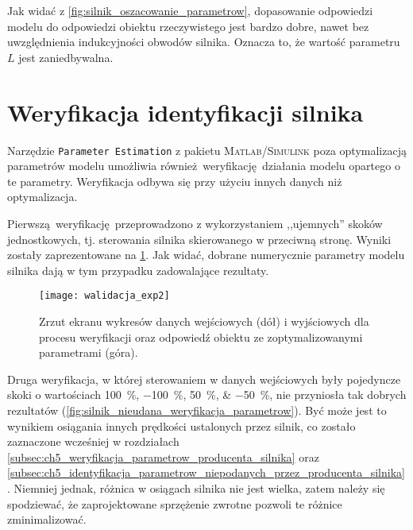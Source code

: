 
Jak widać z \cref{fig:silnik_oszacowanie_parametrow}, dopasowanie odpowiedzi modelu do odpowiedzi obiektu rzeczywistego jest bardzo dobre, nawet bez uwzględnienia indukcyjności obwodów silnika. Oznacza to, że wartość parametru $L$ jest zaniedbywalna.

\section{Weryfikacja identyfikacji silnika}
\label{sec:ch5_weryfikacja_identyfikacji_silnika}

Narzędzie \texttt{Parameter Estimation} z pakietu \textsc{Matlab/Simulink} poza optymalizacją parametrów modelu umożliwia również weryfikację działania modelu opartego o te parametry. Weryfikacja odbywa się przy użyciu innych danych niż optymalizacja.

Pierwszą weryfikację przeprowadzono z wykorzystaniem ,,ujemnych'' skoków jednostkowych, tj. sterowania silnika skierowanego w przeciwną stronę. Wyniki zostały zaprezentowane na \cref{fig:silnik_weryfikacja_parametrow}. Jak widać, dobrane numerycznie parametry modelu silnika dają w tym przypadku zadowalające rezultaty.

\begin{figure}[h]
    \centering
    \texttt{[image: walidacja\_exp2]}
    \caption{Zrzut ekranu wykresów danych wejściowych (dół) i wyjściowych dla procesu weryfikacji oraz odpowiedź obiektu ze zoptymalizowanymi parametrami (góra).}
    \label{fig:silnik_weryfikacja_parametrow}
\end{figure}

Druga weryfikacja, w której sterowaniem w danych wejściowych były pojedyncze skoki o wartościach \SIlist{100;-100;50;-50}{\percent}, nie przyniosła tak dobrych rezultatów (\cref{fig:silnik_nieudana_weryfikacja_parametrow}). Być może jest to wynikiem osiągania innych prędkości ustalonych przez silnik, co zostało zaznaczone wcześniej w rozdziałach \ref{subsec:ch5_weryfikacja_parametrow_producenta_silnika} oraz \ref{subsec:ch5_identyfikacja_parametrow_niepodanych_przez_producenta_silnika}. Niemniej jednak, różnica w osiągach silnika nie jest wielka, zatem należy się spodziewać, że zaprojektowane sprzężenie zwrotne pozwoli te różnice zminimalizować.

